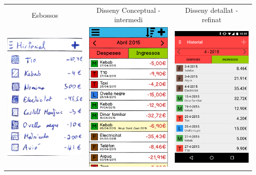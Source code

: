 \begin{table}
\begin{tabular}{| c | c | c |}
\hline
Esbossos & Disseny Conceptual - intermedi & Disseny detallat - refinat \\
\includegraphics[width=50mm]{1_History.jpg} &
\includegraphics[width=50mm]{2_History.png} &
\includegraphics[width=50mm]{3_History.png}  \\

\end{tabular}
\end{table}

